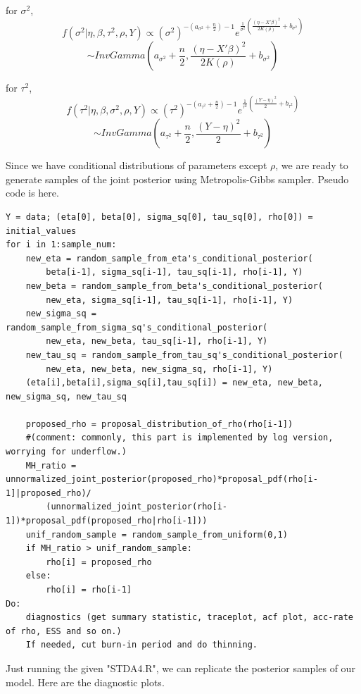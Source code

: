 \documentclass{article}
\begin{document}
for $\sigma^2$,
\[f(\sigma^2|\eta,\beta,\tau^2,\rho,Y) \propto (\sigma^2)^{-(a_{\sigma^2}+\frac{n}{2})-1} e^{\frac{1}{\sigma^2}(\frac{(\eta - X'\beta)^2}{2K(\rho)}+b_{\sigma^2})}
\]
\[\sim InvGamma(a_{\sigma^2}+\frac{n}{2}, \frac{(\eta - X'\beta)^2}{2K(\rho)}+b_{\sigma^2})\]

for $\tau^2$,
\[f(\tau^2|\eta,\beta,\sigma^2,\rho,Y) \propto (\tau^2)^{-(a_{\tau^2}+\frac{n}{2})-1} e^{\frac{1}{\tau^2}(\frac{(Y - \eta)^2}{2}+b_{\tau^2})}
\]
\[\sim InvGamma(a_{\tau^2}+\frac{n}{2}, \frac{(Y - \eta)^2}{2}+b_{\tau^2})\]


Since we have conditional distributions of parameters except $\rho$,
we are ready to generate samples of the joint posterior using Metropolis-Gibbs sampler.
Pseudo code is here.
\begin{mdframed}
    \begin{small}
        \begin{verbatim}
Y = data; (eta[0], beta[0], sigma_sq[0], tau_sq[0], rho[0]) = initial_values
for i in 1:sample_num:
    new_eta = random_sample_from_eta's_conditional_posterior(
        beta[i-1], sigma_sq[i-1], tau_sq[i-1], rho[i-1], Y)
    new_beta = random_sample_from_beta's_conditional_posterior(
        new_eta, sigma_sq[i-1], tau_sq[i-1], rho[i-1], Y)
    new_sigma_sq = random_sample_from_sigma_sq's_conditional_posterior(
        new_eta, new_beta, tau_sq[i-1], rho[i-1], Y)
    new_tau_sq = random_sample_from_tau_sq's_conditional_posterior(
        new_eta, new_beta, new_sigma_sq, rho[i-1], Y)
    (eta[i],beta[i],sigma_sq[i],tau_sq[i]) = new_eta, new_beta, new_sigma_sq, new_tau_sq

    proposed_rho = proposal_distribution_of_rho(rho[i-1])
    #(comment: commonly, this part is implemented by log version, worrying for underflow.)
    MH_ratio = unnormalized_joint_posterior(proposed_rho)*proposal_pdf(rho[i-1]|proposed_rho)/
        (unnormalized_joint_posterior(rho[i-1])*proposal_pdf(proposed_rho|rho[i-1]))
    unif_random_sample = random_sample_from_uniform(0,1)
    if MH_ratio > unif_random_sample:
        rho[i] = proposed_rho
    else:
        rho[i] = rho[i-1]
Do:
    diagnostics (get summary statistic, traceplot, acf plot, acc-rate of rho, ESS and so on.)
    If needed, cut burn-in period and do thinning.
        \end{verbatim}
    \end{small}
\end{mdframed}

\clearpage
Just running the given "STDA4.R", we can replicate the posterior samples of our model.
Here are the diagnostic plots.
\end{document}

